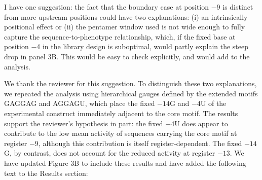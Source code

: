 \documentclass[11pt]{article}
\newenvironment{response}{\par\color{responseblue}}{\par}
\begin{document}
I have one suggestion: the fact that the boundary case at position $-$9 is
distinct from more upstream positions could have two explanations: (i) an
intrinsically positional effect or (ii) the pentamer window used is not wide
enough to fully capture the sequence-to-phenotype relationship, which, if the
fixed base at position $-$4 in the library design is suboptimal, would partly
explain the steep drop in panel 3B. This would be easy to check explicitly, and
would add to the analysis.

\begin{response}
We thank the reviewer for this suggestion. To distinguish these two
explanations, we repeated the analysis using hierarchical gauges defined by the
extended motifs GAGGAG and AGGAGU, which place the fixed $-14$G and $-4$U of the
experimental construct immediately adjacent to the core motif. The results
support the reviewer's hypothesis in part: the fixed $-4$U does appear to
contribute to the low mean activity of sequences carrying the core motif at
register $-9$, although this contribution is itself register-dependent. The fixed
$-14$G, by contrast, does not account for the reduced activity at register $-13$.
We have updated Figure 3B to include these results and have added the following
text to the Results section:
\end{response}
\end{document}
